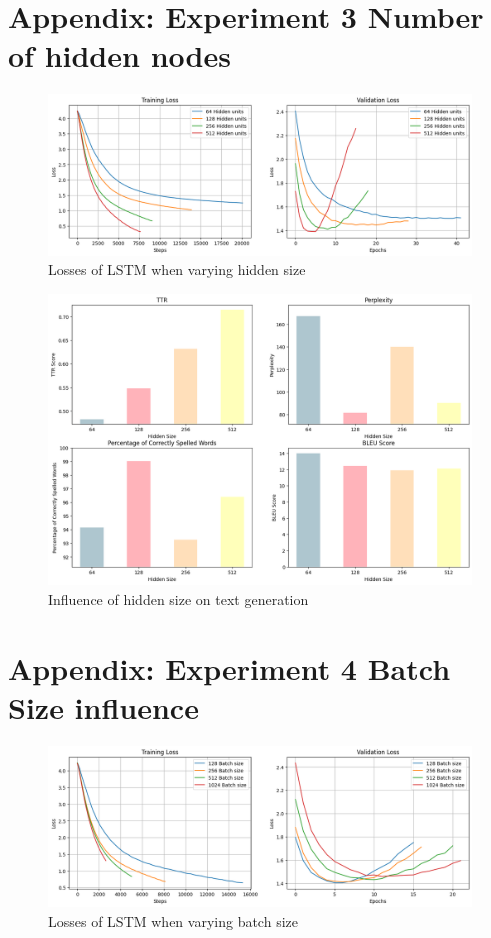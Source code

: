 \documentclass{article}
\begin{document}
\section*{Appendix: Experiment 3 Number of hidden nodes}
\begin{figure}[H]
    \centering
    \includegraphics[width=\linewidth]{figures/LSTM_hidden_sizes.png}
    \caption{Losses of LSTM when varying hidden size}
    \label{fig:loss_hidden}
\end{figure}

\begin{figure}[H]
    \centering
    \includegraphics[width=0.8\linewidth]{figures/text_hidden_size.png}
    \caption{Influence of hidden size on text generation}
    \label{fig:text_hidden}
\end{figure}

\section*{Appendix: Experiment 4 Batch Size influence}
\begin{figure}[H]
    \centering
    \includegraphics[width=\linewidth]{figures/LSTM_batch_size.png}
    \caption{Losses of LSTM when varying batch size}
    \label{fig:loss_batch}
\end{figure}
\end{document}
